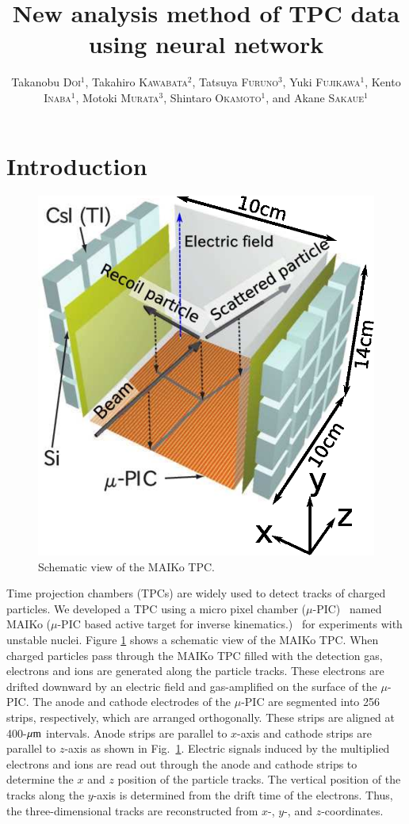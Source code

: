 \documentclass{jps-cp}
\title{New analysis method of TPC data using neural network}
\author{
  Takanobu \textsc{Doi}$^{1}$, Takahiro \textsc{Kawabata}$^{2}$, Tatsuya \textsc{Furuno}$^{3}$,
  Yuki \textsc{Fujikawa}$^{1}$, Kento \textsc{Inaba}$^{1}$, Motoki \textsc{Murata}$^{3}$,
  Shintaro \textsc{Okamoto}$^{1}$, and Akane \textsc{Sakaue}$^{1}$}
\begin{document}
\maketitle

\section{Introduction}
\begin{figure}
  \vspace{0zw}
  \centering
  \includegraphics[clip, width=15zw]{eps/MAIKo_v2.eps}
  \caption{Schematic view of the MAIKo TPC.}
  \label{fig:MAIKo}
  \vspace{-2zw}
\end{figure}
Time projection chambers (TPCs) are widely used to detect tracks of charged particles.
We developed a TPC using a micro pixel chamber ($\mu$-PIC)~\cite{mupic} named
MAIKo ($\mu$-PIC based active target for inverse kinematics.)~\cite{MAIKo}
for experiments with unstable nuclei.
Figure \ref{fig:MAIKo} shows a schematic view of the MAIKo TPC.
When charged particles pass through the MAIKo TPC filled with the detection gas,
electrons and ions are generated along the particle tracks.
These electrons are drifted downward by an electric field and
gas-amplified on the surface of the $\mu$-PIC.
The anode and cathode electrodes of the $\mu$-PIC are segmented into 256 strips, respectively,
which are arranged orthogonally.
These strips are aligned at 400-$\rm{\mu m}$ intervals.
Anode strips are parallel to $x$-axis and 
cathode strips are parallel to $z$-axis as shown in Fig.~\ref{fig:MAIKo}. 
Electric signals induced by the multiplied electrons
and ions are read out through the anode and 
cathode strips to determine the $x$ and $z$ position of the particle tracks.
The vertical position of the tracks along the $y$-axis is determined 
from the drift time of the electrons.
Thus, the three-dimensional tracks are reconstructed from $x$-, $y$-, and $z$-coordinates.
\end{document}
